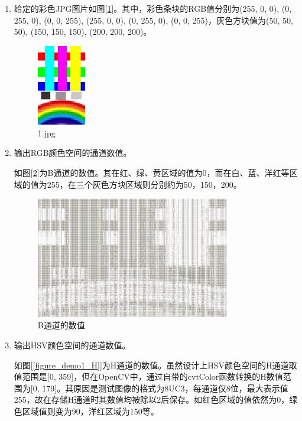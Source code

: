 \documentclass[a4paper, 12pt, UTF8]{article}
\begin{document}
\begin{enumerate}

\item 给定的彩色JPG图片如图[\ref{figure_1}]。其中，彩色条块的RGB值分别为(255, 0, 0), (0, 255, 0), (0, 0, 255), (255, 0, 0), (0, 255, 0), (0, 0, 255)，灰色方块值为(50, 50, 50), (150, 150, 150), (200, 200, 200)。

\begin{figure}[h!]
    \centering
    \includegraphics[width=0.2\textwidth]{in/1.jpg}
    \caption{1.jpg}
    \label{figure_1}
\end{figure}

\item 输出RGB颜色空间的通道数值。

如图[\ref{figure_demo1_B}]为B通道的数值。其在红、绿、黄区域的值为0，而在白、蓝、洋红等区域的值为255，在三个灰色方块区域则分别约为50，150，200。

\begin{figure}[h!]
    \centering
    \includegraphics[width=0.8\textwidth]{out/demo1_B.png}
    \caption{B通道的数值}
    \label{figure_demo1_B}
\end{figure}

\item 输出HSV颜色空间的通道数值。

如图[\ref{figure_demo1_H}]为H通道的数值。虽然设计上HSV颜色空间的H通道取值范围是[0, 359]，但在OpenCV中，通过自带的cvtColor函数转换的H数值范围为[0, 179]。其原因是测试图像的格式为8UC3，每通道仅8位，最大表示值255，故在存储H通道时其数值均被除以2后保存。如红色区域的值依然为0，绿色区域值则变为90，洋红区域为150等。


\end{enumerate}
\end{document}
